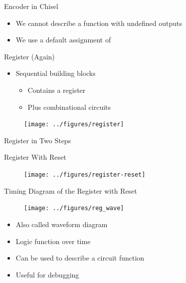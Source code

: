 \begin{frame}[fragile]{Encoder in Chisel}
\begin{itemize}
\item We cannot describe a function with undefined outputs
\item We use a default assignment of 
\end{itemize}

\end{frame}

\begin{frame}[fragile]{Register (Again)}
\begin{itemize}
\item Sequential building blocks
\begin{itemize}
\item Contains a register
\item Plus combinational circuits
\end{itemize}
\end{itemize}
\begin{figure}
  \texttt{[image: ../figures/register]}
\end{figure}
\end{frame}



\begin{frame}[fragile]{Register in Two Steps}
\end{frame}

\begin{frame}[fragile]{Register With Reset}
\begin{figure}
  \texttt{[image: ../figures/register-reset]}
\end{figure}
\end{frame}

\begin{frame}[fragile]{Timing Diagram of the Register with Reset}
\begin{figure}
  \texttt{[image: ../figures/reg\_wave]}
\end{figure}
\begin{itemize}
\item Also called waveform diagram
\item Logic function over time
\item Can be used to describe a circuit function
\item Useful for debugging
\end{itemize}
\end{frame}

